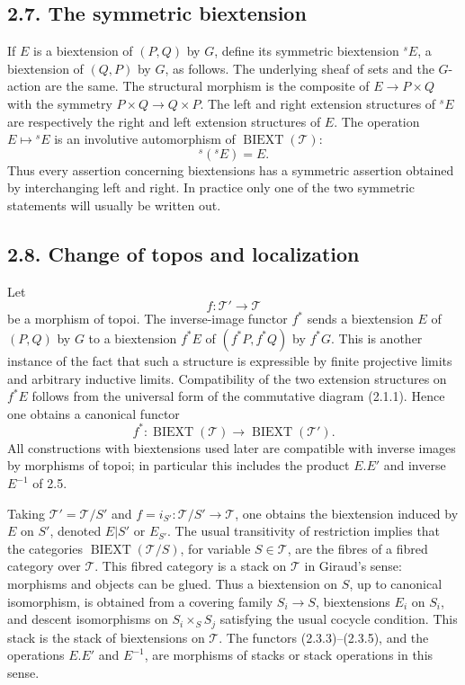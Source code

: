 \documentclass[11pt]{article}
\providecommand{\BIEXT}{\operatorname{BIEXT}}
\begin{document}
\subsection*{2.7. The symmetric biextension}
If \(E\) is a biextension of \((P,Q)\) by \(G\), define its symmetric biextension \({}^sE\), a biextension of \((Q,P)\) by \(G\), as follows.  The underlying sheaf of sets and the \(G\)-action are the same.  The structural morphism is the composite of \(E\to P\times Q\) with the symmetry \(P\times Q\to Q\times P\).  The left and right extension structures of \({}^sE\) are respectively the right and left extension structures of \(E\).  The operation \(E\mapsto{}^sE\) is an involutive automorphism of \(\BIEXT(\mathcal T)\):
\begin{equation}\tag{2.7.1}
  {}^s({}^sE)=E.
\end{equation}
Thus every assertion concerning biextensions has a symmetric assertion obtained by interchanging left and right.  In practice only one of the two symmetric statements will usually be written out.

\subsection*{2.8. Change of topos and localization}
Let
\begin{equation}\tag{2.8.0}
  f:\mathcal T'\longrightarrow\mathcal T
\end{equation}
be a morphism of topoi.  The inverse-image functor \(f^*\) sends a biextension \(E\) of \((P,Q)\) by \(G\) to a biextension \(f^*E\) of \((f^*P,f^*Q)\) by \(f^*G\).  This is another instance of the fact that such a structure is expressible by finite projective limits and arbitrary inductive limits.  Compatibility of the two extension structures on \(f^*E\) follows from the universal form of the commutative diagram (2.1.1).  Hence one obtains a canonical functor
\begin{equation}\tag{2.8.1}
  f^*:\BIEXT(\mathcal T)\longrightarrow\BIEXT(\mathcal T').
\end{equation}
All constructions with biextensions used later are compatible with inverse images by morphisms of topoi; in particular this includes the product \(E.E'\) and inverse \(E^{-1}\) of 2.5.

Taking \(\mathcal T'=\mathcal T/S'\) and \(f=i_{S'}:\mathcal T/S'\to\mathcal T\), one obtains the biextension induced by \(E\) on \(S'\), denoted \(E|S'\) or \(E_{S'}\).  The usual transitivity of restriction implies that the categories \(\BIEXT(\mathcal T/S)\), for variable \(S\in\mathcal T\), are the fibres of a fibred category over \(\mathcal T\).  This fibred category is a stack on \(\mathcal T\) in Giraud's sense: morphisms and objects can be glued.  Thus a biextension on \(S\), up to canonical isomorphism, is obtained from a covering family \(S_i\to S\), biextensions \(E_i\) on \(S_i\), and descent isomorphisms on \(S_i\times_SS_j\) satisfying the usual cocycle condition.  This stack is the stack of biextensions on \(\mathcal T\).  The functors (2.3.3)--(2.3.5), and the operations \(E.E'\) and \(E^{-1}\), are morphisms of stacks or stack operations in this sense.
\end{document}
